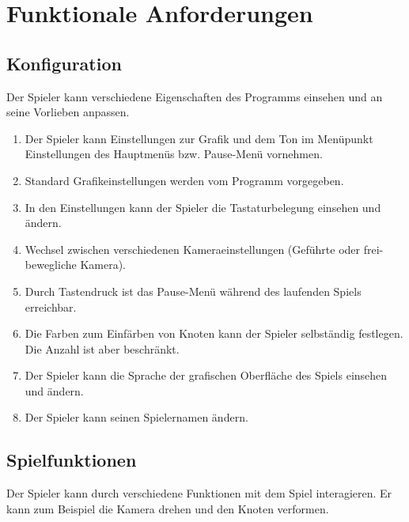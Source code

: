 \chapter{Funktionale Anforderungen}


\renewcommand{\theenumi}{/F\_\arabic{enumi}0/}
\renewcommand{\labelenumi}{\theenumi}



\section{Konfiguration}
Der Spieler kann verschiedene Eigenschaften des Programms einsehen und an seine Vorlieben anpassen.
\begin{enumerate}
 
\item Der Spieler kann Einstellungen zur Grafik und dem Ton im Menüpunkt Einstellungen des Hauptmenüs bzw. Pause-Menü vornehmen.
\item Standard Grafikeinstellungen werden vom Programm vorgegeben.
\item In den Einstellungen kann der Spieler die Tastaturbelegung einsehen und  ändern. %
\item Wechsel zwischen verschiedenen Kameraeinstellungen (Geführte oder frei-bewegliche Kamera).  %
\item Durch Tastendruck ist das Pause-Menü während des laufenden Spiels erreichbar.
\item Die Farben zum Einfärben von Knoten kann der Spieler selbständig festlegen. Die Anzahl ist aber beschränkt. %
\item Der Spieler kann die Sprache der grafischen Oberfläche des Spiels einsehen und ändern. %
\item Der Spieler kann seinen Spielernamen ändern.

\end{enumerate}

\section{Spielfunktionen}
Der Spieler kann durch verschiedene Funktionen mit dem Spiel interagieren. Er kann zum Beispiel die Kamera drehen und den Knoten verformen. 

